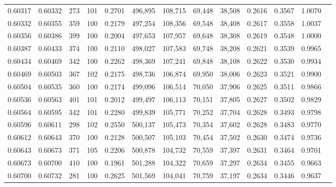 \begin{tabular}{rrrrrrrrrrrrr}
0.60317 & 0.60332 &   273 & 101 &                                     0.2701 & 496,895 & 108,715 &  69,448 &  38,508 & 0.2616 & 0.3567 & 1.0070 \\
0.60332 & 0.60355 &   359 & 100 &                                     0.2179 & 497,254 & 108,356 &  69,548 &  38,408 & 0.2617 & 0.3558 & 1.0037 \\
0.60356 & 0.60386 &   399 & 100 &                                     0.2004 & 497,653 & 107,957 &  69,648 &  38,308 & 0.2619 & 0.3548 & 1.0000 \\
0.60387 & 0.60433 &   374 & 100 &                                     0.2110 & 498,027 & 107,583 &  69,748 &  38,208 & 0.2621 & 0.3539 & 0.9965 \\
0.60434 & 0.60469 &   342 & 100 &                                     0.2262 & 498,369 & 107,241 &  69,848 &  38,108 & 0.2622 & 0.3530 & 0.9934 \\
0.60469 & 0.60503 &   367 & 102 &                                     0.2175 & 498,736 & 106,874 &  69,950 &  38,006 & 0.2623 & 0.3521 & 0.9900 \\
0.60504 & 0.60535 &   360 & 100 &                                     0.2174 & 499,096 & 106,514 &  70,050 &  37,906 & 0.2625 & 0.3511 & 0.9866 \\
0.60536 & 0.60563 &   401 & 101 &                                     0.2012 & 499,497 & 106,113 &  70,151 &  37,805 & 0.2627 & 0.3502 & 0.9829 \\
0.60564 & 0.60595 &   342 & 101 &                                     0.2280 & 499,839 & 105,771 &  70,252 &  37,704 & 0.2628 & 0.3493 & 0.9798 \\
0.60596 & 0.60611 &   298 & 102 &                                     0.2550 & 500,137 & 105,473 &  70,354 &  37,602 & 0.2628 & 0.3483 & 0.9770 \\
0.60612 & 0.60643 &   370 & 100 &                                     0.2128 & 500,507 & 105,103 &  70,454 &  37,502 & 0.2630 & 0.3474 & 0.9736 \\
0.60643 & 0.60673 &   371 & 105 &                                     0.2206 & 500,878 & 104,732 &  70,559 &  37,397 & 0.2631 & 0.3464 & 0.9701 \\
0.60673 & 0.60700 &   410 & 100 &                                     0.1961 & 501,288 & 104,322 &  70,659 &  37,297 & 0.2634 & 0.3455 & 0.9663 \\
0.60700 & 0.60732 &   281 & 100 &                                     0.2625 & 501,569 & 104,041 &  70,759 &  37,197 & 0.2634 & 0.3446 & 0.9637 \\

\end{tabular}
